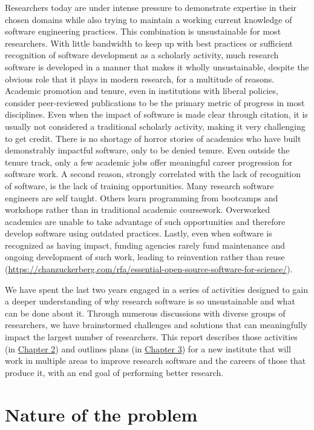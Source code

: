 \documentclass[
]{book}
\begin{document}
Researchers today are under intense pressure to demonstrate expertise in their chosen domains
while also trying to maintain a working current knowledge of software engineering practices.
This combination is unsustainable for most researchers. With little bandwidth to keep up
with best practices or sufficient recognition of software development as a scholarly activity,
much research software is developed in a manner that makes it wholly unsustainable, despite
the obvious role that it plays in modern research, for a multitude of reasons. Academic
promotion and tenure, even in institutions with liberal policies, consider peer-reviewed
publications to be the primary metric of progress in most disciplines. Even when the impact
of software is made clear through citation, it is usually not considered a traditional
scholarly activity, making it very challenging to get credit. There is no shortage of horror
stories of academics who have built demonstrably impactful software, only to be denied tenure.
Even outside the tenure track, only a few academic jobs offer meaningful career progression
for software work. A second reason, strongly correlated with the lack of recognition of
software, is the lack of training opportunities. Many research software engineers are
self taught. Others learn programming from bootcamps and workshops rather than in traditional
academic coursework. Overworked academics are unable to take advantage of such opportunities
and therefore develop software using outdated practices. Lastly, even when software is
recognized as having impact, funding agencies rarely fund maintenance and ongoing development
of such work, leading to reinvention rather than
reuse (\url{https://chanzuckerberg.com/rfa/essential-open-source-software-for-science/}).

We have spent the last two years engaged in a series of activities designed to gain a deeper
understanding of why research software is so unsustainable and what can be done about it.
Through numerous discussions with diverse groups of researchers, we have brainstormed
challenges and solutions that can meaningfully impact the largest number of researchers.
This report describes those activities (in \protect\hyperlink{chapter2}{Chapter 2}) and outlines plans
(in \protect\hyperlink{chapter3}{Chapter 3}) for a new institute that will work in multiple areas to improve
research software and the careers of those that produce it, with an end goal of performing
better research.

\hypertarget{nature-of-the-problem}{%
\section{Nature of the problem}\label{nature-of-the-problem}}
\end{document}
